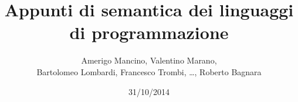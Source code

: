 \documentclass[12pt,a4]{book}
\begin{document}
\title{Appunti di semantica dei linguaggi di programmazione}
\author{Amerigo Mancino, Valentino Marano, \\
        Bartolomeo Lombardi, Francesco Trombi, \dots, Roberto Bagnara}
\date{31/10/2014}

\maketitle

\tableofcontents












\end{document}
